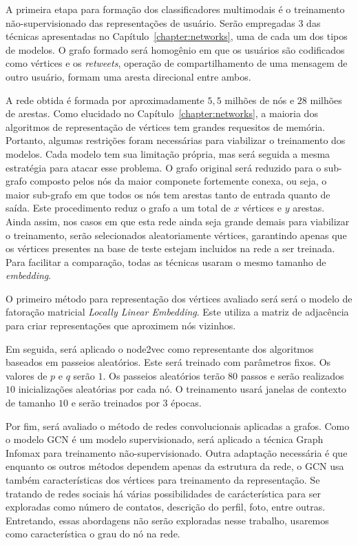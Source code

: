 A primeira etapa para formação dos classificadores multimodais é o treinamento
não-supervisionado das representações de usuário.
Serão empregadas 3 das técnicas apresentadas no Capítulo~\ref{chapter:networks},
uma de cada um dos tipos de modelos.
O grafo formado será homogênio em que os usuários são codificados como vértices
e os \textit{retweets}, operação de compartilhamento de uma mensagem de outro
usuário, formam uma aresta direcional entre ambos.

A rede obtida é formada por aproximadamente $5,5$ milhões de nós e $28$ milhões
de arestas.
Como elucidado no Capítulo~\ref{chapter:networks}, a maioria dos algoritmos de
representação de vértices tem grandes requesitos de memória.
Portanto, algumas restrições foram necessárias para viabilizar o treinamento dos
modelos.
Cada modelo tem sua limitação própria, mas será seguida a mesma estratégia para
atacar esse problema.
O grafo original será reduzido para o sub-grafo composto pelos nós da maior
componete fortemente conexa, ou seja, o maior sub-grafo em que todos os nós
tem arestas tanto de entrada quanto de saída.
Este procedimento reduz o grafo a um total de $x$ vértices e $y$ arestas.
Ainda assim, nos casos em que esta rede ainda seja grande demais para viabilizar
o treinamento, serão selecionados aleatoriamente vértices, garantindo apenas que
os vértices presentes na base de teste estejam incluidos na rede a ser treinada.
Para facilitar a comparação, todas as técnicas usaram o mesmo tamanho de
\textit{embedding}.

O primeiro método para representação dos vértices avaliado será será o modelo de
fatoração matricial \textit{Locally Linear Embedding}.
Este utiliza a matriz de adjacência para criar representações que aproximem nós
vizinhos.

Em seguida, será aplicado o node2vec como representante dos algoritmos baseados
em passeios aleatórios.
Este será treinado com parâmetros fixos.
Os valores de $p$ e $q$ serão $1$.
Os passeios aleatórios terão $80$ passos e serão realizados $10$ inicializações
aleatórias por cada nó.
O treinamento usará janelas de contexto de tamanho $10$ e serão treinados por
$3$ épocas.

Por fim, será avaliado o método de redes convolucionais aplicadas a grafos.
Como o modelo GCN é um modelo supervisionado, será aplicado a técnica Graph
Infomax para treinamento não-supervisionado.
Outra adaptação necessária é que enquanto os outros métodos dependem apenas da
estrutura da rede, o GCN usa também características dos vértices para
treinamento da representação.
Se tratando de redes sociais há várias possibilidades de carácterística para ser
exploradas como número de contatos, descrição do perfil, foto, entre outras.
Entretando, essas abordagens não serão exploradas nesse trabalho, usaremos como
característica o grau do nó na rede.

